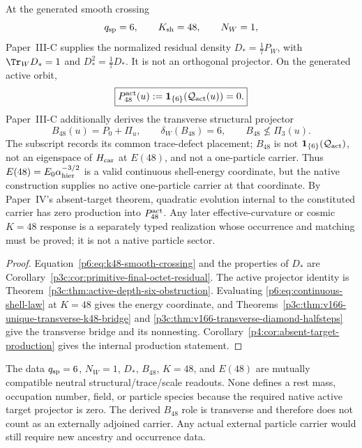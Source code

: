 \documentclass[12pt,a4paper]{article}
\begin{document}
\begin{theorem}[Native carrier desert at \(K=48\)]
\label{p6:thm:native-k48-carrier-desert}
At the generated smooth crossing
\begin{equation}
 \label{p6:eq:k48-smooth-crossing}
 q_{\rm sp}=6,
 \qquad K_{\rm sh}=48,
 \qquad N_W=1,
\end{equation}
Paper~III-C supplies the normalized residual density
\(D_*=\frac17P_W\), with \(\Tr_WD_*=1\) and
\(D_*^2=\frac17D_*\).  It is not an orthogonal projector.  On the generated
active orbit,
\begin{equation}
 \label{p6:eq:k48-active-projector-zero}
 \boxed{P_{48}^{\rm act}(u)
 :=\mathbf1_{\{6\}}(\mathcal Q_{\rm act}(u))=0.}
\end{equation}
Paper~III-C additionally derives the transverse structural projector
\[
 B_{48}(u)=P_0+\Pi_u,
 \qquad
 \delta_W(B_{48})=6,
 \qquad
 B_{48}\not\le\Pi_3(u).
\]
The subscript records its common trace-defect placement; \(B_{48}\) is not
\(\mathbf1_{\{6\}}(\mathcal Q_{\rm act})\), not an eigenspace of
\(H_{\rm car}\) at \(E(48)\), and not a one-particle carrier.
Thus \(E(48)=E_0\alpha_{\rm hier}^{-3/2}\) is a valid continuous shell-energy
coordinate, but the native construction supplies no active one-particle
carrier at that coordinate.  By Paper~IV's absent-target theorem, quadratic
evolution internal to the constituted carrier has zero production into
\(P_{48}^{\rm act}\).  Any later effective-curvature or cosmic \(K=48\)
response is a separately typed realization whose occurrence and matching
must be proved; it is not a native particle sector.
\end{theorem}

\begin{proof}
Equation~\eqref{p6:eq:k48-smooth-crossing} and the properties of \(D_*\) are
Corollary~\ref{p3c:cor:primitive-final-octet-residual}.  The active projector
identity is Theorem~\ref{p3c:thm:active-depth-six-obstruction}.  Evaluating
\eqref{p6:eq:continuous-shell-law} at \(K=48\) gives the energy coordinate,
and Theorems~\ref{p3c:thm:v166-unique-transverse-k48-bridge} and
\ref{p3c:thm:v166-transverse-diamond-halfsteps} give the transverse bridge
and its nonnesting.  Corollary~\ref{p4:cor:absent-target-production} gives the
internal production statement.
\end{proof}

\begin{corollary}[Carrier-free \(K=48\) scale]
\label{p6:cor:carrier-free-k48-scale}
The data \(q_{\rm sp}=6\), \(N_W=1\), \(D_*\), \(B_{48}\), \(K=48\), and
\(E(48)\) are mutually compatible neutral structural/trace/scale readouts.
None defines a rest mass, occupation number, field, or particle species
because the required native active target projector is zero.  The derived
\(B_{48}\) role is transverse and therefore does not count as an externally
adjoined carrier.  Any actual external particle carrier would still require
new ancestry and occurrence data.
\end{corollary}
\end{document}
